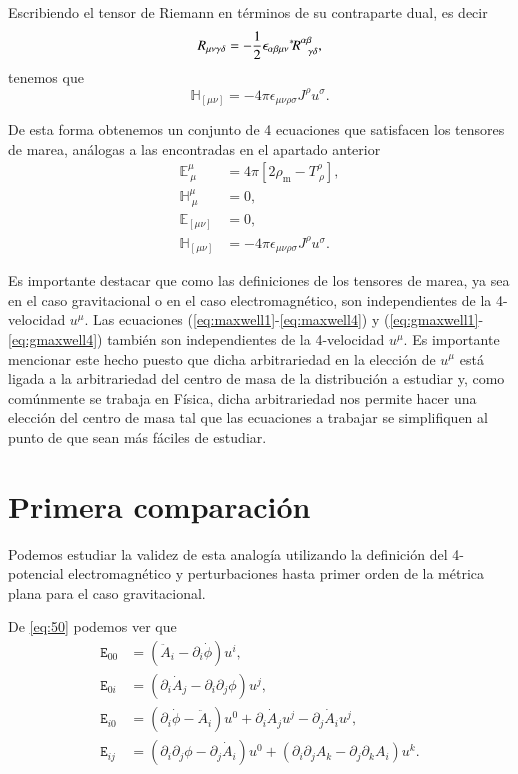 Escribiendo el tensor de Riemann en términos de su contraparte dual, es decir
\begin{equation}
R_{\mu \nu \gamma \delta} = -\frac{1}{2} \epsilon_{\alpha \beta \mu \nu} \dual{R}^{\alpha \beta}_{\ \ \gamma \delta},
\end{equation} 
tenemos que
\begin{equation}
\mathbb{H}_{[\mu \nu]} = -4 \pi \epsilon_{\mu \nu \rho \sigma} J^{\rho} u^{\sigma}.
\end{equation}

De esta forma obtenemos un conjunto de 4 ecuaciones que satisfacen los tensores de marea, análogas a las encontradas en el apartado anterior
\begin{align}
\label{eq:gmaxwell1}
\mathbb{E}^{\mu}_{\ \mu} &= 4 \pi \left[ 2\rho_{\mathrm{m}} - T^{\rho}_{\ \rho} \right],\\
\label{eq:gmaxwell2}
\mathbb{H}^{\mu}_{\ \mu} &= 0,\\
\label{eq:gmaxwell3}
\mathbb{E}_{[\mu \nu]} &= 0,\\
\label{eq:gmaxwell4}
\mathbb{H}_{[\mu \nu]} &= -4 \pi \epsilon_{\mu \nu \rho \sigma} J^{\rho} u^{\sigma}.
\end{align}

Es importante destacar que como las definiciones de los tensores de marea, ya sea en el caso gravitacional o en el caso electromagnético, son independientes de la 4-velocidad $u^{\mu}$. Las ecuaciones (\ref{eq:maxwell1}-\ref{eq:maxwell4}) y (\ref{eq:gmaxwell1}-\ref{eq:gmaxwell4}) también son independientes de la 4-velocidad $u^{\mu}$. Es importante mencionar este hecho puesto que dicha arbitrariedad en la elección de $u^{\mu}$ está ligada a la arbitrariedad del centro de masa de la distribución a estudiar y, como comúnmente se trabaja en Física, dicha arbitrariedad nos permite hacer una elección del centro de masa tal que las ecuaciones a trabajar se simplifiquen al punto de que sean más fáciles de estudiar.

\section{Primera comparación}

Podemos estudiar la validez de esta analogía utilizando la definición del 4-potencial electromagnético y perturbaciones hasta primer orden de la métrica plana para el caso gravitacional.

De \eqref{eq:50} podemos ver que
\begin{align}
\mathtt{E}_{00} &= (\ddot{A}_i - \partial_i \dot{\phi})u^i, \\
\mathtt{E}_{0i} &= (\partial_i \dot{A}_j - \partial_i \partial_j \phi) u^j,\\
\mathtt{E}_{i0} &= (\partial_i \dot{\phi} - \ddot{A}_i) u^0 + \partial_i \dot{A}_j u^j - \partial_j \dot{A}_i u^j,\\
\mathtt{E}_{ij} &= (\partial_i \partial_j \phi - \partial_j \dot{A}_i)u^0 + (\partial_i \partial_j A_k - \partial_j \partial_k A_i)u^k.
\end{align}

